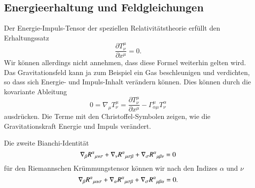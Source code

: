 \subsection{Energieerhaltung und Feldgleichungen}
Der Energie-Impuls-Tensor der speziellen Relativitätstheorie
erfüllt den Erhaltungssatz
\[
\frac{\partial T^\mu_\nu}{\partial x^\mu}
=0.
\]
Wir können allerdings nicht annehmen, dass diese Formel weiterhin
gelten wird.
Das Gravitationsfeld kann ja zum Beispiel ein Gas beschleunigen und 
verdichten, so dass sich Energie- und Impuls-Inhalt verändern können.
Dies können durch die kovariante Ableitung
\[
0
=
\nabla_\mu T^\mu_\nu
=
\frac{\partial T^\mu_\nu}{\partial x^\mu}
-
\Gamma^{\mu}_{\alpha\mu}T^\alpha_\nu
\]
ausdrücken.
Die Terme mit den Christoffel-Symbolen zeigen, wie die Gravitationskraft
Energie und Impuls verändert.

Die zweite Bianchi-Identität
\begin{equation}
\nabla_\beta R^\alpha\mathstrut_{\mu\nu\sigma}
+
\nabla_\nu R^\alpha\mathstrut_{\mu\sigma\beta}
+
\nabla_\sigma R^\alpha\mathstrut_{\mu\beta\nu}
=0
\end{equation}
für den Riemannschen Krümmungstensor können wir nach den
Indizes $\alpha$ und $\nu$
\begin{equation}
\nabla_\beta R^\alpha\mathstrut_{\mu\alpha\sigma}
+
\nabla_\alpha R^\alpha\mathstrut_{\mu\sigma\beta}
+
\nabla_\sigma R^\alpha\mathstrut_{\mu\beta\alpha}
=0.
\end{equation}


